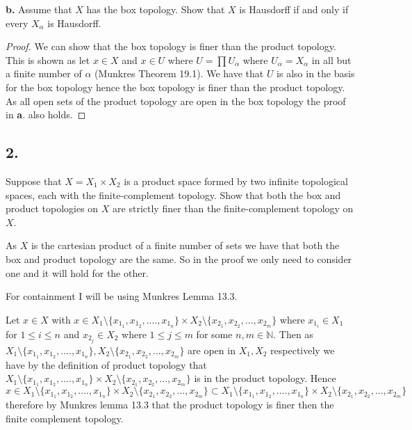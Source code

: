 \documentclass{amsart}
\theoremstyle{plain}
\theoremstyle{definition}
\theoremstyle{remark}
\begin{document}
\vspace{.1in}
{\bfseries b.} Assume that $X$ has the box topology. Show that $X$ is Hausdorff if and only if every $X_{\alpha}$ is Hausdorff. 


\begin{proof}
    We can show that the box topology is finer than the product topology. This is shown as let $x\in X$ and $x\in U$ where $U=\prod U_\alpha$ where $U_\alpha=X_\alpha$ in all but a finite number of $\alpha$ (Munkres Theorem 19.1). We have that $U$ is also in the basis for the box topology hence the box topology is finer than the product topology. As all open sets of the product topology are open in the box topology the proof in {\bfseries a}. also holds.
\end{proof}


\vspace{.15in}
\noindent
\subsection*{2.} Suppose that $X = X_1 \times X_2$ is a product space formed by two infinite topological spaces, each with the finite-complement topology. Show that both the box and product topologies on $X$ are strictly finer than the finite-complement topology on $X$. 


As $X$ is the cartesian product of a finite number of sets we have that both the box and product topology are the same. So in the proof we only need to consider one and it will hold for the other. 

For containment I will be using Munkres Lemma 13.3. 

Let $x\in X$ with $x\in X_1\setminus \{x_{1_1},x_{1_2},....,x_{1_n}\}\times X_2\setminus \{x_{2_1},x_{2_2},...,x_{2_m}\}$ where $x_{1_{i}}\in X_1$ for $1 \leq i\leq n$ and $x_{2_j}\in X_2$ where $1\leq j \leq m$ for some $n,m\in \mathbb{N}$. Then as $X_1\setminus \{x_{1_1},x_{1_2},....,x_{1_n}\}, X_2\setminus \{x_{2_1},x_{2_2},...,x_{2_m}\}$ are open in $X_1,X_2$ respectively we have by the definition of product topology that $X_1\setminus \{x_{1_1},x_{1_2},....,x_{1_n}\}\times X_2\setminus \{x_{2_1},x_{2_2},...,x_{2_m}\}$ is in the product topology. Hence $x\in X_1\setminus \{x_{1_1},x_{1_2},....,x_{1_n}\}\times X_2\setminus \{x_{2_1},x_{2_2},...,x_{2_m}\}\subset X_1\setminus \{x_{1_1},x_{1_2},....,x_{1_n}\}\times X_2\setminus \{x_{2_1},x_{2_2},...,x_{2_m}\}$ therefore by Munkres lemma 13.3 that the product topology is finer then the finite complement topology.
\end{document}
